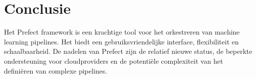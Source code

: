 \section{Conclusie}
Het Prefect framework is een krachtige tool voor het orkestreren van machine learning pipelines. Het biedt een gebruiksvriendelijke interface, flexibiliteit en schaalbaarheid. De nadelen van Prefect zijn de relatief nieuwe status, de beperkte ondersteuning voor cloudproviders en de potentiële complexiteit van het definiëren van complexe pipelines.